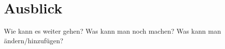 \chapter{Ausblick}
\label{ch:ausblick}
Wie kann es weiter gehen? Was kann man noch machen? Was kann man ändern/hinzufügen?